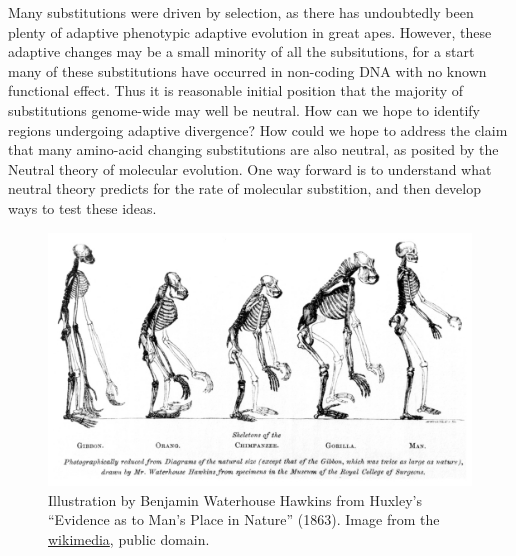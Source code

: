 Many substitutions were driven by selection, as there has undoubtedly
been plenty of adaptive phenotypic adaptive evolution in great apes. However, these adaptive changes may be a small
minority of all the subsitutions, for a start many of these substitutions have occurred in
non-coding DNA with no known functional effect. Thus it is reasonable
initial position that the majority of substitutions genome-wide may well be
neutral. 
How can we hope to identify regions undergoing adaptive divergence?
How could we hope to address the claim that many amino-acid changing
substitutions are also neutral, as posited by the Neutral theory of
molecular evolution. One way forward is to understand what neutral theory predicts for the
rate of molecular substition, and then develop ways to test
these ideas. 

\begin{figure}
\begin{center}
  \includegraphics[width = \textwidth]{illustration_images/Genetic_drift/Huxley_mans_place/Huxley_Mans_Place_in_Nature.jpg}
\end{center}
\caption{Illustration by Benjamin Waterhouse Hawkins from Huxley's
  ``Evidence as to Man's Place in Nature'' (1863).
\newline \noindent \tiny{Image from the
  \href{https://en.wikipedia.org/wiki/Pithecometra_principle\#/media/File:Huxley_-_Mans_Place_in_Nature.jpg}{wikimedia},
   public domain.} 
} \label{fig:Huxley_man}
\end{figure}


